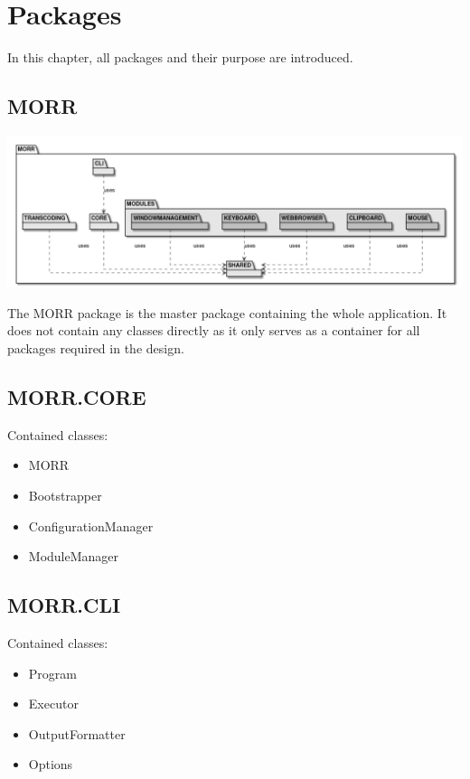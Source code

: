 \chapter{Packages}
\label{ch:package}

In this chapter, all packages and their purpose are introduced.

\section{MORR}

\begin{center}
    \includegraphics[width=1.0\textwidth]{resources/Packages/AllPackages.png}
\end{center}

The MORR package is the master package containing the whole application. It does not contain any classes directly as it only serves as a container for all packages required in the design.

\section{MORR.CORE}

Contained classes:
\begin{itemize}
\item MORR 
\item Bootstrapper
\item ConfigurationManager
\item ModuleManager
\end{itemize}

\section{MORR.CLI}

Contained classes:
\begin{itemize}
\item Program
\item Executor
\item OutputFormatter
\item Options
\end{itemize}

